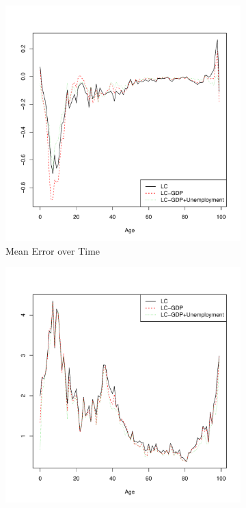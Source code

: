 \documentclass[AER, draftmode]{AEA}
\begin{document}
\begin{figure}[!htp]
	\begin{subfigure}{0.4\textwidth}
		\includegraphics[width=\linewidth]{CAN_error_age_male} 
		\caption{Mean Error over Time}
		\label{fig:errora}
	\end{subfigure}
	\begin{subfigure}{0.4\textwidth}
		\includegraphics[width=\linewidth]{CAN_abs_error_age_male} 

\end{subfigure}
\end{figure}
\end{document}
